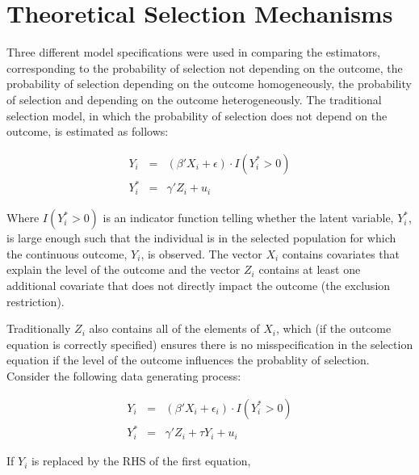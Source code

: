 \documentclass{article}
\begin{document}
\section{Theoretical Selection Mechanisms}

Three different model specifications were used in comparing the estimators, corresponding to the probability of selection not depending on the outcome, the probability of selection depending on the outcome homogeneously, the probability of selection and depending on the outcome heterogeneously.  The traditional selection model, in which the probability of selection does not depend on the outcome, is estimated as follows:

\begin{eqnarray*}
Y_i&=&(\beta'X_i + \epsilon)\cdot I(Y^*_i>0) \\
Y^*_i&=&\gamma'Z_i + u_i
\end{eqnarray*}

Where $I(Y^*_i>0)$ is an indicator function telling whether the latent variable, $Y^*_i$, is large enough such that the individual is in the selected population for which the continuous outcome, $Y_i$, is observed.  The vector $X_i$ contains covariates that explain the level of the outcome and the vector $Z_i$ contains at least one additional covariate that does not directly impact the outcome (the exclusion restriction).  

Traditionally $Z_i$ also contains all of the elements of $X_i$, which (if the outcome equation is correctly specified) ensures there is no misspecification in the selection equation if the level of the outcome influences the probablity of selection. Consider the following data generating process:

\begin{eqnarray*}
Y_i&=&(\beta'X_i + \epsilon_i)\cdot I(Y^*_i>0) \\
Y^*_i&=&\gamma'Z_i +\tau Y_i + u_i
\end{eqnarray*}

 
If $Y_i$ is replaced by the RHS of the first equation,
\end{document}
